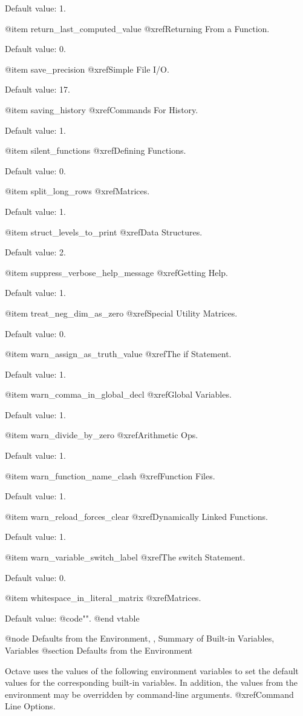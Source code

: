 Default value: 1.

@item return_last_computed_value
@xref{Returning From a Function}.

Default value: 0.

@item save_precision
@xref{Simple File I/O}.

Default value: 17.

@item saving_history
@xref{Commands For History}.

Default value: 1.

@item silent_functions
@xref{Defining Functions}.

Default value: 0.

@item split_long_rows
@xref{Matrices}.

Default value: 1.

@item struct_levels_to_print
@xref{Data Structures}.

Default value: 2.

@item suppress_verbose_help_message
@xref{Getting Help}.

Default value: 1.

@item treat_neg_dim_as_zero
@xref{Special Utility Matrices}.

Default value: 0.

@item warn_assign_as_truth_value
@xref{The if Statement}.

Default value: 1.

@item warn_comma_in_global_decl
@xref{Global Variables}.

Default value: 1.

@item warn_divide_by_zero
@xref{Arithmetic Ops}.

Default value: 1.

@item warn_function_name_clash
@xref{Function Files}.

Default value: 1.

@item warn_reload_forces_clear
@xref{Dynamically Linked Functions}.

Default value: 1.

@item warn_variable_switch_label
@xref{The switch Statement}.

Default value: 0.

@item whitespace_in_literal_matrix
@xref{Matrices}.

Default value: @code{""}.
@end vtable


@node Defaults from the Environment,  , Summary of Built-in Variables, Variables
@section Defaults from the Environment

Octave uses the values of the following environment variables to set the
default values for the corresponding built-in variables.  In addition,
the values from the environment may be overridden by command-line
arguments.  @xref{Command Line Options}.

